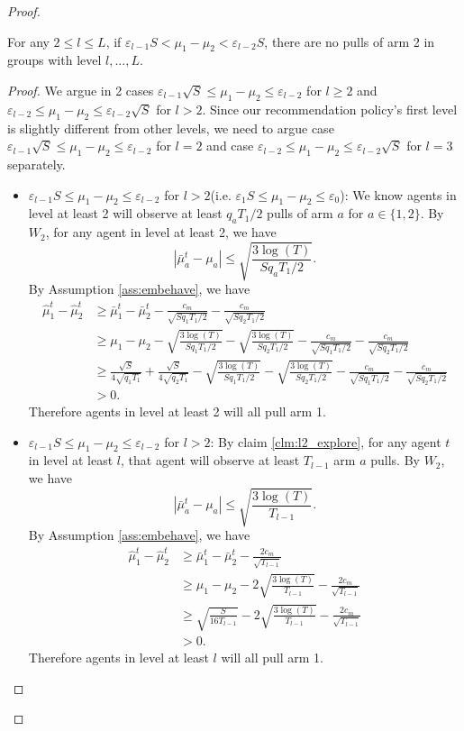 \begin{proof}
\begin{claim}
\label{clm:l2_exploit}
For any $2 \leq l \leq L$, if $\varepsilon_{l-1} S < \mu_1 - \mu_2 < \varepsilon_{l-2} S$, there are no pulls of arm 2 in groups with level $l,...,L$. 
\end{claim}

\begin{proof}
We argue in 2 cases $\varepsilon_{l-1} \sqrt{S} \leq \mu_1 - \mu_2 \leq \varepsilon_{l-2}$ for $l \geq 2$ and $\varepsilon_{l-2}  \leq \mu_1 - \mu_2 \leq \varepsilon_{l-2} \sqrt{S}$ for $l > 2$. Since our recommendation policy's first level is slightly different from other levels, we need to argue case $\varepsilon_{l-1} \sqrt{S} \leq \mu_1 - \mu_2 \leq \varepsilon_{l-2}$ for $l=2$ and case $\varepsilon_{l-2}  \leq \mu_1 - \mu_2 \leq \varepsilon_{l-2} \sqrt{S}$ for $l =3$ separately.

\begin{itemize}
\item $\varepsilon_{l-1} S \leq \mu_1 - \mu_2 \leq \varepsilon_{l-2}$ for $l > 2$(i.e. $\varepsilon_1S\leq \mu_1 - \mu_2 \leq \varepsilon_0$): We know agents in level at least 2 will observe at least $q_aT_1/2$ pulls of arm $a$ for $a \in \{1,2\}$. By $W_2$, for any agent in level at least 2, we have
\[
|\bar{\mu}_a^t - \mu_a| \leq \sqrt{\frac{3\log(T)}{Sq_aT_1/2}}.
\]
By Assumption \ref{ass:embehave}, we have
\begin{align*}
\hat{\mu}_1^t - \hat{\mu}_2^t &\geq \bar{\mu}_1^t - \bar{\mu}_2^t - \frac{c_m}{\sqrt{Sq_1T_1/2}} -  \frac{c_m}{\sqrt{Sq_2T_1/2}}\\
&\geq \mu_1 -\mu_2-\sqrt{\frac{3\log(T)}{Sq_1T_1/2}} - \sqrt{\frac{3\log(T)}{Sq_2T_1/2}}- \frac{c_m}{\sqrt{Sq_1T_1/2}} -  \frac{c_m}{\sqrt{Sq_2T_1/2}}\\
&\geq\frac{\sqrt{S}}{4\sqrt{q_1T_1}} +  \frac{\sqrt{S}}{4\sqrt{q_2T_1}}-\sqrt{\frac{3\log(T)}{Sq_1T_1/2}} - \sqrt{\frac{3\log(T)}{Sq_2T_1/2}}- \frac{c_m}{\sqrt{Sq_1T_1/2}} -  \frac{c_m}{\sqrt{Sq_2T_1/2}}\\
&>0.
\end{align*}
Therefore agents in level at least 2 will all pull arm 1. 

\item $\varepsilon_{l-1} S \leq \mu_1 - \mu_2 \leq \varepsilon_{l-2}$ for $l > 2$: By claim \ref{clm:l2_explore}, for any agent $t$ in level at least $l$, that agent will observe at least $T_{l-1}$ arm $a$ pulls. By $W_2$, we have
\[
|\bar{\mu}_a^t - \mu_a| \leq \sqrt{\frac{3\log(T)}{T_{l-1}}}.
\]
By Assumption \ref{ass:embehave}, we have
\begin{align*}
\hat{\mu}_1^t - \hat{\mu}_2^t &\geq \bar{\mu}_1^t - \bar{\mu}_2^t - \frac{2c_m}{\sqrt{T_{l-1}}} \\
&\geq \mu_1 -\mu_2 - 2 \sqrt{\frac{3\log(T)}{T_{l-1}}}- \frac{2c_m}{\sqrt{T_{l-1}}} \\
&\geq\sqrt{\frac{S}{16T_{l-1}}} -  2 \sqrt{\frac{3\log(T)}{T_{l-1}}}- \frac{2c_m}{\sqrt{T_{l-1}}} \\
&>0.
\end{align*}
Therefore agents in level at least $l$ will all pull arm 1. 


\end{itemize}
\end{proof}
\end{proof}
